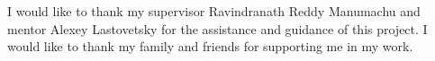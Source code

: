 I would like to thank my supervisor Ravindranath Reddy Manumachu and mentor Alexey Lastovetsky for the assistance and guidance of this project. I would like to thank my family and friends for supporting me in my work.